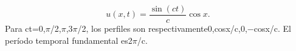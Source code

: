 \[u(x,t)=\frac{\sin(ct)}c\cos x.\]
Para ct=0,\ensuremath{\pi}/2,\ensuremath{\pi},3\ensuremath{\pi}/2, los perfiles son respectivamente0,cosx/c,0,\ensuremath{-}cosx/c.
El período temporal fundamental es2\ensuremath{\pi}/c.
